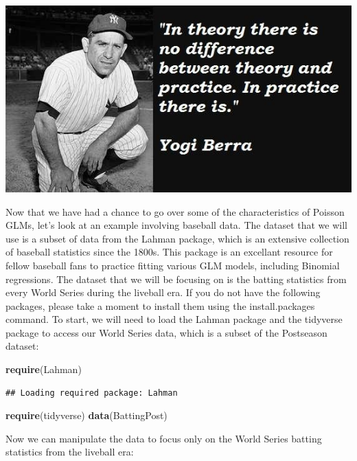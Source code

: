 \documentclass[
]{book}
\newenvironment{Shaded}{\begin{snugshade}}{\end{snugshade}}
\newcommand{\KeywordTok}[1]{\textcolor[rgb]{0.13,0.29,0.53}{\textbf{#1}}}
\newcommand{\NormalTok}[1]{#1}
\begin{document}
\includegraphics{images/bsb.jpg}

Now that we have had a chance to go over some of the characteristics of Poisson GLMs, let's look at an example involving baseball data. The dataset that we will use is a subset of data from the Lahman package, which is an extensive collection of baseball statistics since the 1800s. This package is an excellant resource for fellow baseball fans to practice fitting various GLM models, including Binomial regressions. The dataset that we will be focusing on is the batting statistics from every World Series during the liveball era. If you do not have the following packages, please take a moment to install them using the install.packages command. To start, we will need to load the Lahman package and the tidyverse package to access our World Series data, which is a subset of the Postseason dataset:

\begin{Shaded}
\begin{Highlighting}[]
\KeywordTok{require}\NormalTok{(Lahman)}
\end{Highlighting}
\end{Shaded}

\begin{verbatim}
## Loading required package: Lahman
\end{verbatim}

\begin{Shaded}
\begin{Highlighting}[]
\KeywordTok{require}\NormalTok{(tidyverse)}
\KeywordTok{data}\NormalTok{(BattingPost)}
\end{Highlighting}
\end{Shaded}

Now we can manipulate the data to focus only on the World Series batting statistics from the liveball era:
\end{document}
